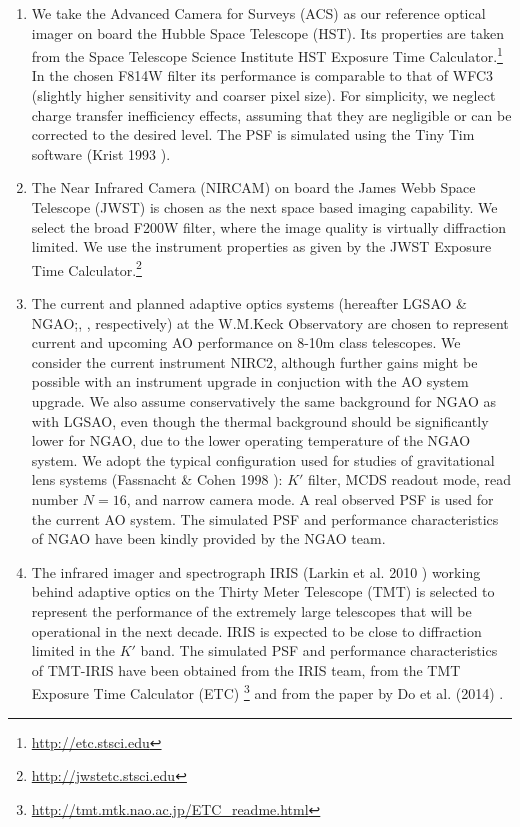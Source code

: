 \documentclass[a4paper,11pt]{article}
\begin{document}
\begin{enumerate}

\item  We take the Advanced Camera for Surveys (ACS) as our reference
optical imager on board the Hubble Space Telescope (HST). Its
properties are taken from the Space Telescope Science Institute HST
Exposure Time Calculator.\footnote{\url{http://etc.stsci.edu}} In the
chosen F814W filter its performance is comparable to that of WFC3
(slightly higher sensitivity and coarser pixel size). For simplicity,
we neglect charge transfer inefficiency effects, assuming that they
are negligible or can be corrected to the desired level. The PSF is
simulated using the Tiny Tim software (Krist 1993
\cite{1993ASPC...52..536K}).


\item The Near Infrared Camera (NIRCAM) on board the James Webb Space
Telescope (JWST) is chosen as the next space based imaging capability.
We select the broad F200W filter, where the image quality is virtually
diffraction limited. We use the instrument properties as given by the
JWST Exposure Time Calculator.\footnote{\url{http://jwstetc.stsci.edu}}

\item The current and planned adaptive optics systems (hereafter LGSAO \&
NGAO;\citep{2006PASP..118..297W}, \citep{2010SPIE.7736E..0KW},
respectively) at the W.M.Keck Observatory are chosen to represent
current and upcoming AO performance on 8-10m class telescopes. We
consider the current instrument NIRC2, although further gains might be
possible with an instrument upgrade in conjuction with the AO system
upgrade. We also assume conservatively the same background for NGAO as
with LGSAO, even though the thermal background should be significantly
lower for NGAO, due to the lower operating temperature of the NGAO
system. We adopt the typical configuration used for studies of
gravitational lens systems (Fassnacht \& Cohen 1998
\citep{1998AJ....115..377F}): $K'$ filter, MCDS readout mode, read
number $N=16$, and narrow camera mode. A real observed PSF is used for
the current AO system. The simulated PSF and performance
characteristics of NGAO have been kindly provided by the NGAO team.

\item The infrared imager and spectrograph IRIS (Larkin et al. 2010
\citep{2010SPIE.7735E..29L}) working behind adaptive optics on the
Thirty Meter Telescope (TMT) is selected to represent the performance
of the extremely large telescopes that will be operational in the next
decade. IRIS is expected to be close to diffraction limited in the
$K'$ band. The simulated PSF and performance characteristics of
TMT-IRIS have been obtained from the IRIS team, from the TMT Exposure
Time Calculator (ETC)
\footnote{\url{http://tmt.mtk.nao.ac.jp/ETC_readme.html}} and from the
paper by Do et al. (2014) \citep{2014AJ....147...93D}.


\end{enumerate}
\end{document}
